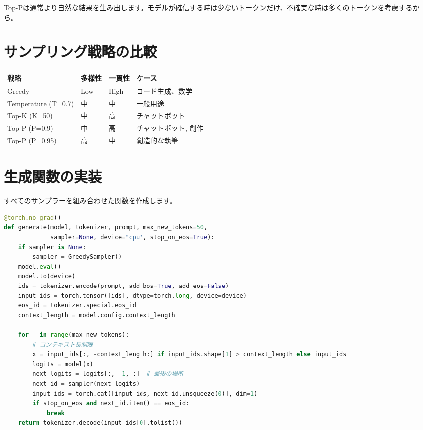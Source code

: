 Top-Pは通常より自然な結果を生み出します。モデルが確信する時は少ないトークンだけ、不確実な時は多くのトークンを考慮するから。

\section{サンプリング戦略の比較}

\begin{center}
\begin{tabularx}{\textwidth}{lXXX}
\toprule
\textbf{戦略}&\textbf{多様性}&\textbf{一貫性}&\textbf{ケース}\\
\midrule
Greedy & Low & High & コード生成、数学 \\
Temperature (T=0.7) & 中 & 中 & 一般用途 \\
Top-K (K=50) & 中 & 高 & チャットボット \\
Top-P (P=0.9) & 中 & 高 & チャットボット, 創作 \\
Top-P (P=0.95) & 高 & 中 & 創造的な執筆 \\
\bottomrule
\end{tabularx}
\end{center}

\section{生成関数の実装}

すべてのサンプラーを組み合わせた関数を作成します。

\begin{lstlisting}[language=Python]
@torch.no_grad()
def generate(model, tokenizer, prompt, max_new_tokens=50,
             sampler=None, device="cpu", stop_on_eos=True):
    if sampler is None:
        sampler = GreedySampler()
    model.eval()
    model.to(device)
    ids = tokenizer.encode(prompt, add_bos=True, add_eos=False)
    input_ids = torch.tensor([ids], dtype=torch.long, device=device)
    eos_id = tokenizer.special.eos_id
    context_length = model.config.context_length

    for _ in range(max_new_tokens):
        # コンテキスト長制限
        x = input_ids[:, -context_length:] if input_ids.shape[1] > context_length else input_ids
        logits = model(x)
        next_logits = logits[:, -1, :]  # 最後の場所
        next_id = sampler(next_logits)
        input_ids = torch.cat([input_ids, next_id.unsqueeze(0)], dim=1)
        if stop_on_eos and next_id.item() == eos_id:
            break
    return tokenizer.decode(input_ids[0].tolist())
\end{lstlisting}

